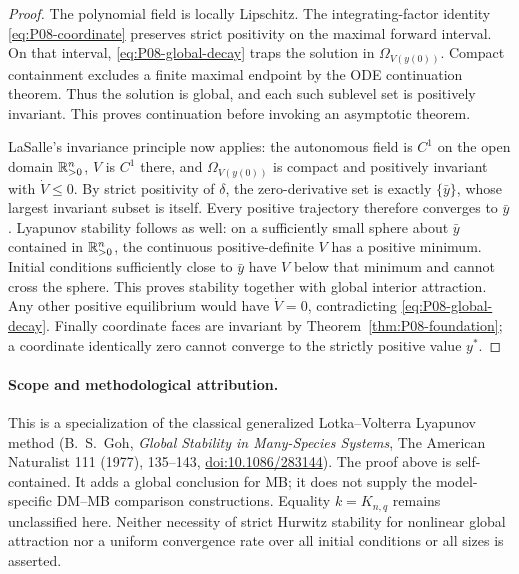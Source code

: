\begin{proof}
The polynomial field is locally Lipschitz. The integrating-factor
identity \eqref{eq:P08-coordinate} preserves strict positivity on the
maximal forward interval. On that interval, \eqref{eq:P08-global-decay}
traps the solution in $\Omega_{V(y(0))}$. Compact containment excludes
a finite maximal endpoint by the ODE continuation theorem. Thus the
solution is global, and each such sublevel set is positively invariant.
This proves continuation before invoking an asymptotic theorem.

LaSalle's invariance principle now applies: the autonomous field is
$C^1$ on the open domain $\mathbb{R}_{>0}^{n}$, $V$ is $C^1$ there, and
$\Omega_{V(y(0))}$ is compact and positively invariant with
$\dot V\le0$. By strict positivity of $\delta$, the zero-derivative
set is exactly $\{\bar y\}$, whose largest invariant subset is itself.
Every positive trajectory therefore converges to $\bar y$.
Lyapunov stability follows as well: on a sufficiently small sphere
about $\bar y$ contained in $\mathbb{R}_{>0}^{n}$, the continuous positive-definite
$V$ has a positive minimum. Initial conditions sufficiently close to
$\bar y$ have $V$ below that minimum and cannot cross the sphere.
This proves stability together with global interior attraction.
Any other positive equilibrium would have $\dot V=0$, contradicting
\eqref{eq:P08-global-decay}. Finally coordinate faces are invariant
by Theorem~\ref{thm:P08-foundation}; a coordinate identically zero
cannot converge to the strictly positive value $y^*$.
\end{proof}

\paragraph{Scope and methodological attribution.}
This is a specialization of the classical generalized Lotka--Volterra
Lyapunov method (B.~S.~Goh, \emph{Global Stability in Many-Species
Systems}, The American Naturalist 111 (1977), 135--143,
\href{https://doi.org/10.1086/283144}{doi:10.1086/283144}).
The proof above is self-contained. It adds a global conclusion for MB;
it does not supply the model-specific DM--MB comparison constructions.
Equality $k=K_{n,q}$ remains unclassified here. Neither necessity of
strict Hurwitz stability for nonlinear global attraction nor a uniform
convergence rate over all initial conditions or all sizes is asserted.

